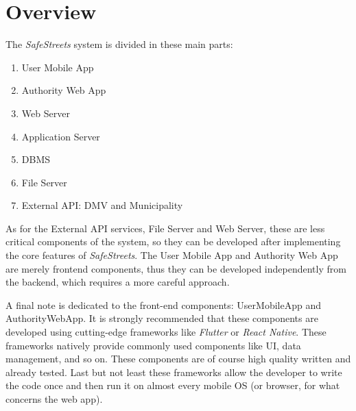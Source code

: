 \section{Overview}
The \emph{SafeStreets} system is divided in these main parts:
\begin{enumerate}
    \item User Mobile App
    \item Authority Web App
    \item Web Server
    \item Application Server
    \item DBMS
    \item File Server
    \item External API: DMV and Municipality
\end{enumerate}

As for the External API services, File Server and Web Server, these are less
critical components of the system, so they can be developed after implementing
the core features of \emph{SafeStreets}. The User Mobile App and Authority Web
App are merely frontend components, thus they can be developed independently
from the backend, which requires a more careful approach.

A final note is dedicated to the front-end components: UserMobileApp and
AuthorityWebApp. It is strongly recommended that these components are developed
using cutting-edge frameworks like \emph{Flutter} or \emph{React Native}. These
frameworks natively provide commonly used components like UI, data management,
and so on. These components are of course high quality written and already
tested. Last but not least these frameworks allow the developer to write the
code once and then run it on almost every mobile OS (or browser, for what
concerns the web app).